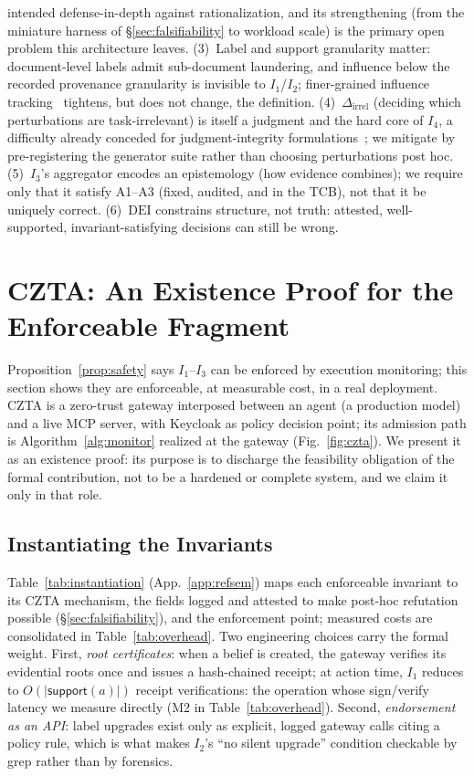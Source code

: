 \documentclass[conference]{IEEEtran}
\newcommand{\Ione}{\ensuremath{I_1}}
\newcommand{\Itwo}{\ensuremath{I_2}}
\newcommand{\Ithree}{\ensuremath{I_3}}
\newcommand{\Ifour}{\ensuremath{I_4}}
\newcommand{\support}{\ensuremath{\mathsf{support}}}
\newcommand{\Dirrel}{\ensuremath{\Delta_{\mathrm{irrel}}}}
\newcommand{\DEI}{\ensuremath{\mathrm{DEI}}}
\begin{document}
intended defense-in-depth against rationalization, and its
strengthening (from the miniature harness of
\S\ref{sec:falsifiability} to workload scale) is the primary open
problem this architecture leaves.
(3)~Label and support granularity matter: document-level labels
admit sub-document laundering, and influence below the recorded
provenance granularity is invisible to \Ione/\Itwo; finer-grained
influence tracking~\cite{argus,cxi} tightens, but does not change,
the definition. (4)~$\Dirrel$ (deciding which perturbations are
task-irrelevant) is itself a judgment and the hard core of
\Ifour, a difficulty already conceded for judgment-integrity
formulations~\cite{qu}; we mitigate by pre-registering the
generator suite rather than choosing perturbations post hoc.
(5)~\Ithree's aggregator encodes an epistemology (how evidence
combines); we require only that it satisfy A1--A3 (fixed,
audited, and in the TCB), not that it be uniquely correct.
(6)~\DEI{} constrains structure, not truth: attested,
well-supported, invariant-satisfying decisions can still be wrong.



\section{CZTA: An Existence Proof for the Enforceable Fragment}
\label{sec:czta}
Proposition~\ref{prop:safety} says \Ione--\Ithree{} can be
enforced by execution monitoring; this section shows they are
enforceable, at measurable cost, in a real deployment. CZTA is a
zero-trust gateway interposed between an agent (a production
model) and a live MCP server, with Keycloak as policy decision
point; its admission path is Algorithm~\ref{alg:monitor} realized
at the gateway (Fig.~\ref{fig:czta}). We present it as an
existence proof: its purpose is to discharge the feasibility
obligation of the formal contribution, not to be a hardened or
complete system, and we claim it only in that role.

\subsection{Instantiating the Invariants}
Table~\ref{tab:instantiation} (App.~\ref{app:refsem}) maps each enforceable
invariant to
its CZTA mechanism, the fields logged and attested to make
post-hoc refutation possible (\S\ref{sec:falsifiability}), and the
enforcement point; measured costs are consolidated in
Table~\ref{tab:overhead}. Two engineering choices carry the formal
weight. First, \emph{root certificates}: when a belief is created,
the gateway verifies its evidential roots once and issues a
hash-chained receipt; at action time, \Ione{} reduces to
$O(|\support(a)|)$ receipt verifications: the operation whose
sign/verify latency we measure directly (M2 in
Table~\ref{tab:overhead}). Second, \emph{endorsement as an API}:
label upgrades exist only as explicit, logged gateway calls citing
a policy rule, which is what makes \Itwo's ``no silent upgrade''
condition checkable by grep rather than by forensics.
\end{document}
